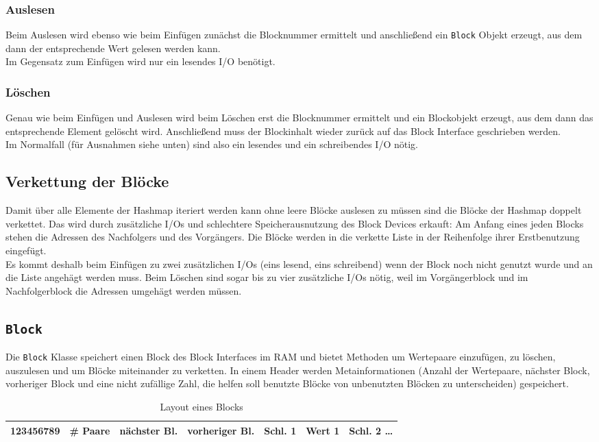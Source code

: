\documentclass{article}
\begin{document}
\subsubsection{Auslesen}
Beim Auslesen wird ebenso wie beim Einfügen zunächst die Blocknummer ermittelt
und anschließend ein \texttt{Block} Objekt erzeugt, aus dem dann der
entsprechende Wert gelesen werden kann. \\
Im Gegensatz zum Einfügen wird nur ein lesendes I/O benötigt.

\subsubsection{Löschen}
Genau wie beim Einfügen und Auslesen wird beim Löschen erst die Blocknummer
ermittelt und ein Blockobjekt erzeugt, aus dem dann das entsprechende Element
gelöscht wird. Anschließend muss der Blockinhalt wieder zurück auf das Block
Interface geschrieben werden.\\
Im Normalfall (für Ausnahmen siehe unten) sind also ein lesendes und ein
schreibendes I/O nötig.

\subsection{Verkettung der Blöcke}
Damit über alle Elemente der Hashmap iteriert werden kann ohne leere Blöcke
auslesen zu müssen sind die Blöcke der Hashmap doppelt verkettet. Das wird durch
zusätzliche I/Os und schlechtere Speicherausnutzung des Block Devices erkauft: Am
Anfang eines jeden Blocks stehen die Adressen des Nachfolgers und des Vorgängers. Die Blöcke
werden in die verkette Liste in der Reihenfolge ihrer Erstbenutzung eingefügt.\\
Es kommt deshalb beim Einfügen zu zwei zusätzlichen I/Os (eins lesend, eins
schreibend) wenn der Block noch nicht genutzt wurde und an die Liste angehägt
werden muss. Beim Löschen sind sogar bis zu vier zusätzliche I/Os nötig, weil im
Vorgängerblock und im Nachfolgerblock die Adressen umgehägt werden müssen.

\subsection{\texttt{Block}}
Die \texttt{Block} Klasse speichert einen Block des Block Interfaces im RAM und
bietet Methoden um Wertepaare einzufügen, zu löschen, auszulesen und um Blöcke
miteinander zu verketten. In einem Header werden Metainformationen (Anzahl der
Wertepaare, nächster Block, vorheriger Block und eine nicht zufällige Zahl, die
helfen soll benutzte Blöcke von unbenutzten Blöcken zu unterscheiden)
gespeichert.
\begin{table}[htb]
\begin{tabular}{|c|c|c|c|||c|c||c|}
\hline
123456789 & \# Paare & nächster Bl. & vorheriger Bl. &
Schl. 1 & Wert 1 & Schl. 2 \ldots \\
\hline
\end{tabular}
\caption{Layout eines Blocks}
\end{table}
\end{document}
